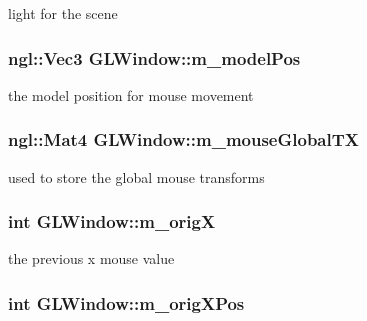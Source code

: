 light for the scene \hypertarget{classGLWindow_a222840baf9b594f95626a55563904684}{
\subsubsection[{m\_\-modelPos}]{\setlength{\rightskip}{0pt plus 5cm}ngl::Vec3 {\bf GLWindow::m\_\-modelPos}}}
\label{classGLWindow_a222840baf9b594f95626a55563904684}


the model position for mouse movement \hypertarget{classGLWindow_ae4cf79c7e425b4033ccef92aa517130a}{
\subsubsection[{m\_\-mouseGlobalTX}]{\setlength{\rightskip}{0pt plus 5cm}ngl::Mat4 {\bf GLWindow::m\_\-mouseGlobalTX}}}
\label{classGLWindow_ae4cf79c7e425b4033ccef92aa517130a}


used to store the global mouse transforms \hypertarget{classGLWindow_ab6aec410f5ce5868cabe5fe2f0768bc9}{
\subsubsection[{m\_\-origX}]{\setlength{\rightskip}{0pt plus 5cm}int {\bf GLWindow::m\_\-origX}}}
\label{classGLWindow_ab6aec410f5ce5868cabe5fe2f0768bc9}


the previous x mouse value \hypertarget{classGLWindow_a176afd6632502975d692b69a90488670}{
\subsubsection[{m\_\-origXPos}]{\setlength{\rightskip}{0pt plus 5cm}int {\bf GLWindow::m\_\-origXPos}}}
\label{classGLWindow_a176afd6632502975d692b69a90488670}


